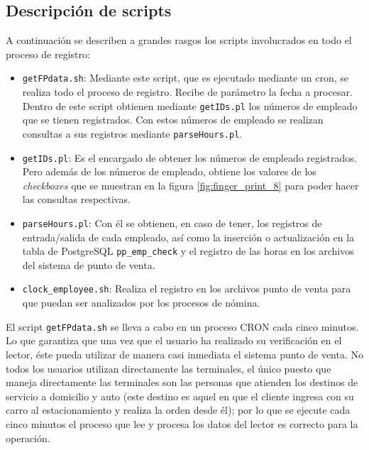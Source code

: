\begin{enumerate}
\end{enumerate}

\subsection{Descripción de scripts}
\label{sec:desc_scripts_finger}

A continuación se describen a grandes rasgos los scripts involucrados en todo el proceso de registro:

\begin{itemize}
 \item \texttt{getFPdata.sh}: Mediante este script, que es ejecutado mediante un cron, se realiza todo el proceso de registro. Recibe de parámetro la fecha a procesar. Dentro de este script obtienen mediante \texttt{getIDs.pl} los números de empleado que se tienen registrados. Con estos números de empleado se realizan consultas a sus registros mediante \texttt{parseHours.pl}.
 \item \texttt{getIDs.pl}: Es el encargado de obtener los números de empleado registrados. Pero además de los números de empleado, obtiene los valores de los \textit{checkboxes} que se muestran en la figura \ref{fig:finger_print_8} para poder hacer las consultas respectivas.
 \item \texttt{parseHours.pl}: Con él se obtienen, en caso de tener, los registros de entrada/salida de cada empleado, así como la inserción o actualización en la tabla de PostgreSQL \texttt{pp\_emp\_check} y el registro de las horas en los archivos del sistema de punto de venta.
 \item \texttt{clock\_employee.sh}: Realiza el registro en los archivos punto de venta para que puedan ser analizados por los procesos de nómina.
\end{itemize}

El script \texttt{getFPdata.sh} se lleva a cabo en un proceso CRON cada cinco minutos. Lo que garantiza que una vez que el usuario ha realizado su verificación en el lector, éste pueda utilizar de manera casi inmediata el sistema punto de venta.  No todos los usuarios utilizan directamente las terminales, el único puesto que maneja directamente las terminales son las personas que atienden los destinos de servicio a domicilio y auto (este destino es aquel en que el cliente ingresa con su carro al estacionamiento y realiza la orden desde él); por lo que se ejecute cada cinco minutos el proceso que lee y procesa los datos del lector es correcto para la operación.

